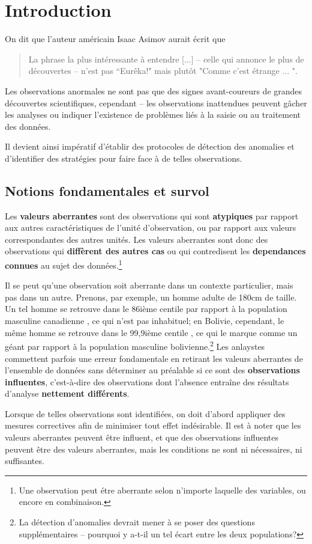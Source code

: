 \newpage\section{Introduction} On dit que l'auteur américain Isaac Asimov aurait \'ecrit que \begin{quote}La phrase la plus int\'eressante à entendre [...] -- celle qui annonce le plus de découvertes -- n'est pas ``Eurêka!" mais plutôt "Comme c'est \'etrange ... ".\end{quote}
Les ob\-ser\-va\-tions anormales ne sont pas que des signes avant-coureurs de grandes découvertes scientifiques, cependant -- les ob\-ser\-va\-tions inattendues peuvent gâcher les analyses ou indiquer l'existence de problèmes liés à la saisie ou au traitement des données. \par Il devient ainsi impératif  d'établir des protocoles de détection des anomalies et d'identifier des stratégies pour faire face à de telles ob\-ser\-va\-tions.
\subsection{Notions fondamentales et survol}
Les \textbf{valeurs aberrantes} sont des ob\-ser\-va\-tions qui sont \textbf{atypiques} par rapport aux autres caract\'eristiques de l'unit\'e d'ob\-ser\-vation, ou par rapport aux valeurs correspondantes des autres unit\'es. Les valeurs aberrantes sont donc des ob\-ser\-va\-tions qui  \textbf{diff\`erent des autres cas} ou qui contredisent les  \textbf{dependances connues} au sujet des donn\'ees.\footnote{Une ob\-ser\-va\-tion peut \'etre aberrante selon n'importe laquelle des variables, ou encore en combinaison.}%
\par Il se peut qu'une ob\-ser\-va\-tion soit aberrante dans un contexte particulier, mais pas dans un autre. Prenons, par exemple, un homme adulte de 180cm de taille. Un tel homme se retrouve dans le 86i\`eme centile par rapport \`a la population masculine canadienne \cite{DP_HPC}, ce qui n'est pas inhabituel; en Bolivie, cependant, le même homme se retrouve dans le 99,9i\`eme centile \cite{DP_HPC}, ce qui le marque comme un g\'eant par rapport \`a la population masculine bolivienne.\footnote{La détection d'anomalies devrait mener \`a se poser des questions suppl\'ementaires -- pourquoi y a-t-il un tel écart entre les deux populations?}
\newl
Les anlaystes commettent parfois une erreur fondamentale en retirant les valeurs aberrantes de l'ensemble de données sans d\'eterminer au pr\'ealable si ce sont des \textbf{ob\-ser\-va\-tions influentes}, c'est-à-dire des ob\-ser\-va\-tions dont l'absence entraîne des résultats d'analyse \textbf{nettement différents}.\par Lorsque de telles ob\-ser\-va\-tions sont identifiées, on doit d'abord appliquer des mesures correctives afin de minimiser tout effet ind\'esirable. Il est \`a noter que les valeurs aberrantes peuvent \^etre influent, et que des ob\-ser\-va\-tions influentes peuvent être des valeurs aberrantes, mais les conditions ne sont ni nécessaires, ni suffisantes.
